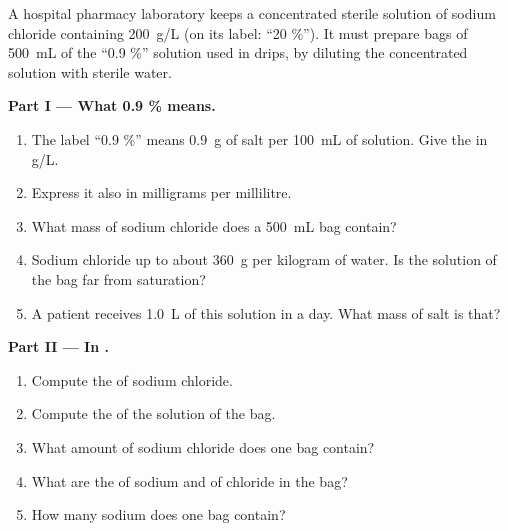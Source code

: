 \begin{problem}
\label{pb:g10:concentration-and-dilution:1}
A hospital pharmacy laboratory keeps a concentrated sterile solution of
sodium chloride containing \qty{200}{g/L} (on its label: ``20 \%''). It
must prepare bags of \qty{500}{mL} of the ``0.9 \%'' solution used in
drips, by diluting the concentrated solution with sterile water.

\medskip
\noindent\textbf{Part I --- What 0.9 \% means.}
\begin{enumerate}
  \item The label ``0.9 \%'' means \qty{0.9}{g} of salt per \qty{100}{mL}
        of solution. Give the  in \si{g/L}.
  \item Express it also in milligrams per millilitre.
  \item What mass of sodium chloride does a \qty{500}{mL} bag contain?
  \item Sodium chloride  up to about \qty{360}{g} per kilogram
        of water. Is the solution of the bag far from saturation?
  \item A patient receives \qty{1.0}{L} of this solution in a day. What
        mass of salt is that?
\end{enumerate}

\medskip
\noindent\textbf{Part II --- In .}
\begin{enumerate}[resume]
  \item Compute the  of sodium chloride.
  \item Compute the  of the solution of the bag.
  \item What amount of sodium chloride does one bag contain?
  \item What are the  of sodium  and of chloride
         in the bag?
  \item How many sodium  does one bag contain?
\end{enumerate}


\end{problem}
